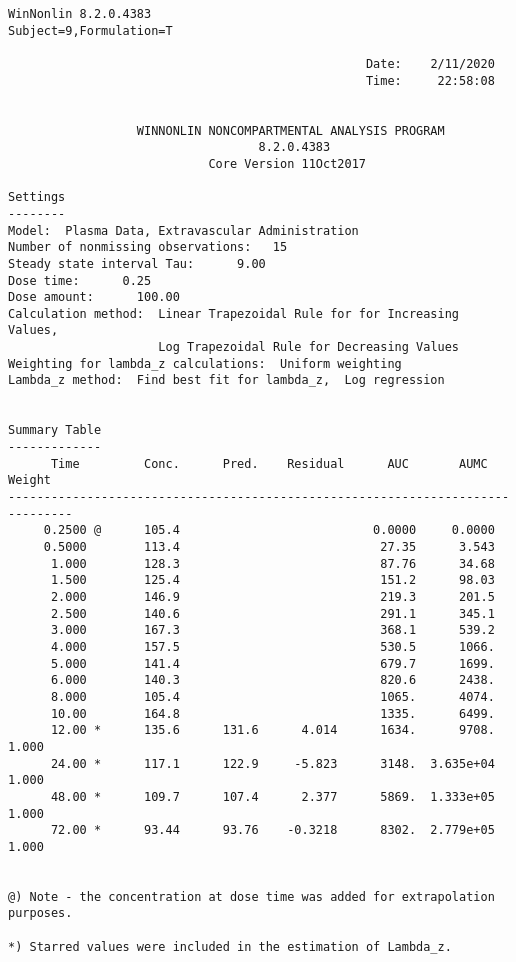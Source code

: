 \documentclass[12pt,a4paper]{article}
\begin{document}
\begin{verbatim}
WinNonlin 8.2.0.4383
Subject=9,Formulation=T

                                                  Date:    2/11/2020
                                                  Time:     22:58:08


                  WINNONLIN NONCOMPARTMENTAL ANALYSIS PROGRAM
                                   8.2.0.4383
                            Core Version 11Oct2017

Settings
--------
Model:  Plasma Data, Extravascular Administration
Number of nonmissing observations:   15
Steady state interval Tau:      9.00
Dose time:      0.25
Dose amount:      100.00
Calculation method:  Linear Trapezoidal Rule for for Increasing Values,
                     Log Trapezoidal Rule for Decreasing Values
Weighting for lambda_z calculations:  Uniform weighting
Lambda_z method:  Find best fit for lambda_z,  Log regression


Summary Table
-------------
      Time         Conc.      Pred.    Residual      AUC       AUMC      Weight
-------------------------------------------------------------------------------
     0.2500 @      105.4                           0.0000     0.0000
     0.5000        113.4                            27.35      3.543
      1.000        128.3                            87.76      34.68
      1.500        125.4                            151.2      98.03
      2.000        146.9                            219.3      201.5
      2.500        140.6                            291.1      345.1
      3.000        167.3                            368.1      539.2
      4.000        157.5                            530.5      1066.
      5.000        141.4                            679.7      1699.
      6.000        140.3                            820.6      2438.
      8.000        105.4                            1065.      4074.
      10.00        164.8                            1335.      6499.
      12.00 *      135.6      131.6      4.014      1634.      9708.      1.000
      24.00 *      117.1      122.9     -5.823      3148.  3.635e+04      1.000
      48.00 *      109.7      107.4      2.377      5869.  1.333e+05      1.000
      72.00 *      93.44      93.76    -0.3218      8302.  2.779e+05      1.000


@) Note - the concentration at dose time was added for extrapolation purposes.

*) Starred values were included in the estimation of Lambda_z.



\end{verbatim}
\end{document}
